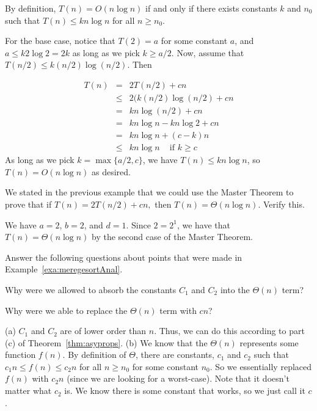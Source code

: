 \begin{exa}
\begin{sol}
By definition, $T(n)=O(n\log n)$ if and only if there exists constants
$k$ and $n_0$ such that $T(n)\leq k n\log n$ for all $n\geq n_0$.

For the base case, notice that $T(2)=a$ for some constant $a$,
and $a\leq k 2\log 2= 2 k$ as long as we pick $k\geq a/2$.
Now, assume that $T(n/2)\leq k(n/2)\log (n/2)$. Then

\begin{eqnarray*}
T(n)&=&2 T(n/2) + c n\\
&\leq&2(k(n/2)\log(n/2)+ c n\\
&=&k n \log(n/2)+ c n\\
&=&k n \log n - k n\log 2 + c n\\
&=&k n\log n + (c-k)n\\
&\leq& k n\log n \,\,\,\,\, \mbox{ if } k\geq c
\end{eqnarray*}
As long as we pick $k=\max\{a/2,c\}$, we have 
$T(n)\leq k n\log n$, so $T(n)=O(n\log n)$ as desired.
\end{sol}
\end{exa}

\begin{exer}
We stated in the previous example that we could use the
Master Theorem to prove that if $T(n)=2 T(n/2)+c n,$
then $T(n)=\Theta(n\log n)$.  Verify this.
\vspace*{1.5in}
\begin{answer}
We have $a=2$, $b=2$, and $d=1$. Since $2=2^1$, we have that 
$T(n)=\Theta(n\log n)$ by the second case of the Master Theorem.
\end{answer}
\end{exer}

\begin{ques}
Answer  the following questions about points that were made in Example~\ref{exa:meregesortAnal}.
\begin{lenum}
\item
Why were we allowed to absorb the constants $C_1$ and $C_2$ into the $\Theta(n)$ term?

\noindent
\answerlinethree
\item
Why were we able to replace the $\Theta(n)$ term with $cn$?

\noindent
\answerlinethree
\end{lenum}
\begin{answer}
(a) $C_1$ and $C_2$ are of lower order than $n$.
Thus, we can do this according to part (c) of Theorem~\ref{thm:asyprops}.
(b) We know that the $\Theta(n)$ represents some function $f(n)$.  By definition of $\Theta$,
there are constants, $c_1$ and $c_2$ such that $c_1n\leq f(n)\leq c_2n$ for all $n\geq n_0$
for some constant $n_0$.  So we essentially replaced $f(n)$ with $c_2n$ (since we are
looking for a worst-case). 
Note that it doesn't matter what $c_2$ is.  
We know there is some constant that works, so we just call it $c$. 
\end{answer}
\end{ques}


